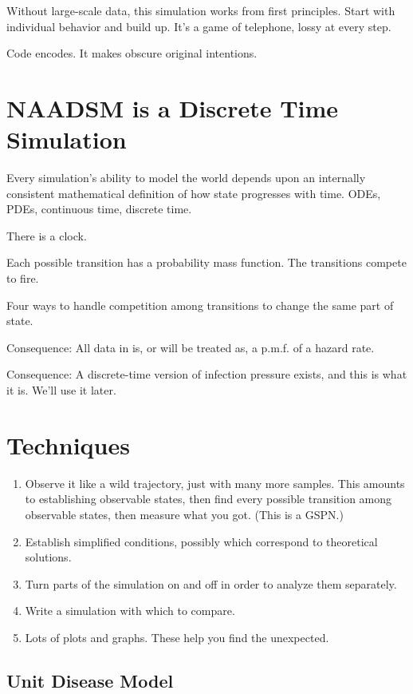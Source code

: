 \documentclass{article}
\begin{document}
Without large-scale data, this simulation works from first principles.
Start with individual behavior and build up.
It's a game of telephone, lossy at every step.

Code encodes. It makes obscure original intentions.

\section{NAADSM is a Discrete Time Simulation}

Every simulation's ability to model the world depends
upon an internally consistent mathematical definition
of how state progresses with time.
ODEs, PDEs, continuous time, discrete time.

There is a clock.

Each possible transition has a probability mass function.
The transitions compete to fire.

Four ways to handle competition among transitions to
change the same part of state.

Consequence: All data in is, or will be treated as, a p.m.f.
of a hazard rate.

Consequence: A discrete-time version of infection pressure
exists, and this is what it is. We'll use it later.


\section{Techniques}
\begin{enumerate}
  \item Observe it like a wild trajectory, just with many more samples.
        This amounts to establishing observable states, then find every
        possible transition among observable states, then measure
        what you got. (This is a GSPN.)
  \item Establish simplified conditions, possibly which correspond
        to theoretical solutions.
  \item Turn parts of the simulation on and off in order to analyze them
        separately.
  \item Write a simulation with which to compare.
  \item Lots of plots and graphs. These help you find the unexpected.
\end{enumerate}

\subsection{Unit Disease Model}
\end{document}
